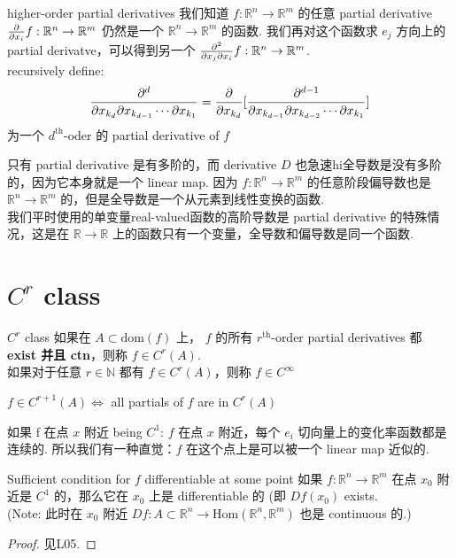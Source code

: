 \begin{definition}{higher-order partial derivatives}
    我们知道 $f: \mathbb{R}^n \rightarrow \mathbb{R}^m$ 的任意 partial derivative ${\partial \over \partial x_i} f: \mathbb{R}^n \rightarrow \mathbb{R}^m$ 仍然是一个 $\mathbb{R}^n \rightarrow \mathbb{R}^m$ 的函数. 我们再对这个函数求 $e_j$ 方向上的 partial derivatve，可以得到另一个 ${\partial^2 \over \partial x_j \partial x_i} f: \mathbb{R}^n \rightarrow \mathbb{R}^m$.\\
    recursively define: 
    $$
    {\partial^d \over \partial x_{k_d}\partial x_{k_{d-1}}\cdots \partial x_{k_1}} = \frac{\partial }{\partial x_{k_d}}[{\partial^{d-1} \over \partial x_{k_{d-1}}\partial x_{k_{d-2}}\cdots \partial x_{k_1}}]
    $$
    为一个 $d^\text{th}$-oder 的 partial derivative of $f$
\end{definition}
\begin{remark}
    只有 partial derivative 是有多阶的，而 derivative $D$ 也急速hi全导数是没有多阶的，因为它本身就是一个 linear map. 因为 $f: \mathbb{R}^n \rightarrow \mathbb{R}^m$ 的任意阶段偏导数也是 $\mathbb{R}^n \rightarrow \mathbb{R}^m$ 的，但是全导数是一个从元素到线性变换的函数.\\
    我们平时使用的单变量real-valued函数的高阶导数是 partial derivative 的特殊情况，这是在 $\mathbb{R} \rightarrow \mathbb{R}$ 上的函数只有一个变量，全导数和偏导数是同一个函数.
\end{remark}

\section{$C^r$ class}
\begin{definition}{$C^r$ class}
    如果在 $A \subset \text{dom}(f)$ 上， $f$ 的所有 $r^\text{th}$-order partial derivatives 都 \textbf{exist 并且 ctn}，则称 $f \in C^r(A)$.
    \\如果对于任意 $r \in \mathbb{N}$ 都有 $f \in C^r(A)$，则称 $f \in C^{\infty}$
\end{definition}


\begin{remark}
    $f \in C^{r+1}(A) \Leftrightarrow $ all partials of $f$ are in $C^r(A)$
\end{remark}



    如果 f 在点 $x$ 附近 being $C^1$: $f$ 在点 $x$ 附近，每个 $e_i$ 切向量上的变化率函数都是连续的. 所以我们有一种直觉：$f$ 在这个点上是可以被一个 linear map 近似的.

\begin{theorem}{Sufficient condition for $f$ differentiable at some point}
    如果 $f: \mathbb{R}^n \rightarrow \mathbb{R}^m$ 在点 $x_0$ 附近是 $C^1$ 的，那么它在 $x_0$ 上是 differentiable 的 (即 $Df(x_0)$ exists.\\
    (Note: 此时在 $x_0$ 附近 $Df: A \subset \mathbb{R}^n \rightarrow \text{Hom}(\mathbb{R}^n, \mathbb{R}^m) $ 也是 continuous 的.)
\end{theorem}
\begin{proof}
见L05.
\end{proof}

